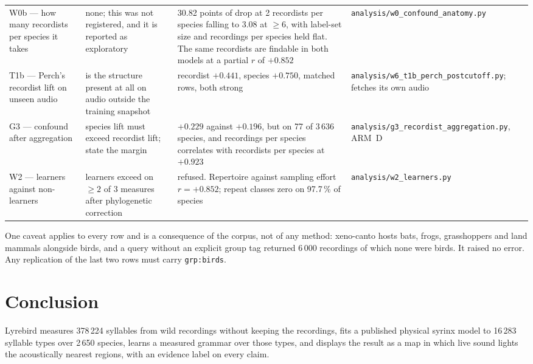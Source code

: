 \documentclass[10pt,twocolumn,a4paper]{article}
\begin{document}
\begin{longtable}{L{2.0cm} L{3.4cm} L{4.6cm} L{5.6cm}}
W0b --- how many recordists per species it takes
& none; this was not registered, and it is reported as exploratory
& 30.82 points of drop at 2 recordists per species falling to 3.08 at $\ge 6$, with label-set
size and recordings per species held flat. The same recordists are findable in both models at
a partial $r$ of $+0.852$
& \texttt{analysis/w0\_confound\_anatomy.py}
\\[2pt]

T1b --- Perch's recordist lift on unseen audio
& is the structure present at all on audio outside the training snapshot
& recordist $+0.441$, species $+0.750$, matched rows, both strong
& \texttt{analysis/w6\_t1b\_perch\_postcutoff.py}; fetches its own audio
\\[2pt]

G3 --- confound after aggregation
& species lift must exceed recordist lift; state the margin
& $+0.229$ against $+0.196$, but on 77 of 3\,636 species, and recordings per species
correlates with recordists per species at $+0.923$
& \texttt{analysis/g3\_recordist\_aggregation.py}, ARM~D
\\[2pt]

W2 --- learners against non-learners
& learners exceed on $\ge 2$ of 3 measures after phylogenetic correction
& refused. Repertoire against sampling effort $r = +0.852$; repeat classes zero on
97.7\,\% of species
& \texttt{analysis/w2\_learners.py}
\\
\end{longtable}
\endgroup
\twocolumn

One caveat applies to every row and is a consequence of the corpus, not of any
method: xeno-canto hosts bats, frogs, grasshoppers and land mammals alongside birds, and a
query without an explicit group tag returned 6\,000 recordings of which none were birds. It
raised no error. Any replication of the last two rows must carry \texttt{grp:birds}.

\section{Conclusion}

Lyrebird measures 378\,224 syllables from wild recordings without keeping the recordings,
fits a published physical syrinx model to 16\,283 syllable types over 2\,650 species, learns a
measured grammar over those types, and displays the result as a map in which live sound lights
the acoustically nearest regions, with an evidence label on every claim.
\end{document}
